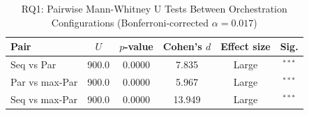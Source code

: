 \begin{table}[t]
        \centering
        \caption{RQ1: Pairwise Mann-Whitney U Tests Between Orchestration Configurations (Bonferroni-corrected $\alpha = 0.017$)}
        \label{tab:rq1_pairwise}
        \begin{tabular}{lccccc}
        \hline
        \textbf{Pair} & \textbf{$U$} & \textbf{$p$-value} & \textbf{Cohen's $d$} & \textbf{Effect size} & \textbf{Sig.} \\
\hline
        Seq vs Par & 900.0 & 0.0000 & 7.835 & Large & $^{***}$ \\
Par vs max-Par & 900.0 & 0.0000 & 5.967 & Large & $^{***}$ \\
Seq vs max-Par & 900.0 & 0.0000 & 13.949 & Large & $^{***}$ \\
        \hline
        \end{tabular}
        \end{table}
